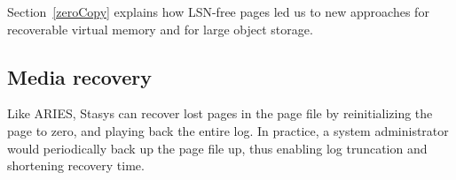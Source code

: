 \documentclass[letterpaper,twocolumn,10pt]{article}
\newcommand{\yad}{Stasys\xspace}
\newcommand{\eat}[1]{}
\begin{document}
Section~\ref{zeroCopy} explains how LSN-free pages led us to new 
approaches for recoverable virtual memory and for large object storage.

\subsection{Media recovery}

Like ARIES, \yad can recover lost pages in the page file by
reinitializing the page to zero, and playing back the entire log.  In
practice, a system administrator would periodically back up the page file
up, thus enabling log truncation and shortening recovery time.

\eat{  This is pretty redundant.
\subsection{Modular operations semantics}

The smallest unit of a \yad transaction is the {\em operation}.  An
operation consists of a {\em redo} function, {\em undo} function, and
a log format.  At runtime or if recovery decides to reapply the
operation, the redo function is invoked with the contents of the log
entry as an argument.  During abort, or if recovery decides to undo
the operation, the undo function is invoked with the contents of the
log as an argument.  Like Berkeley DB, and most database toolkits, we
allow system designers to define new operations.  Unlike earlier
systems, we have based our library of operations on object oriented
collection libraries, and have built complex index structures from
simpler structures.  These modules are all directly avaialable,
providing a wide range of data structures to applications, and
facilitating the develop of more complex structures through reuse.  We
compare the peroformance of our modular approach with a monolithic
implementation on top of \yad, using Berkeley DB as a baseline.
}
\end{document}
